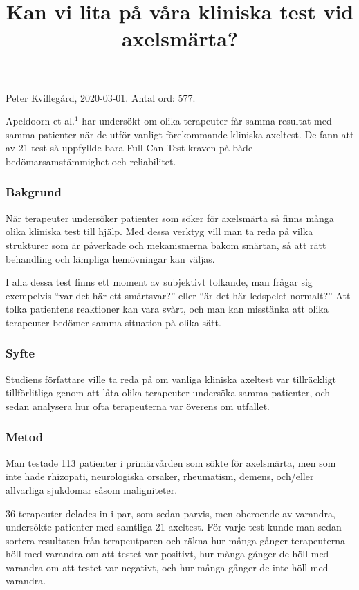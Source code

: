 \documentclass[10pt,a4paper]{article}
\title{Kan vi lita på våra kliniska test vid axelsmärta?}
\author{}
\date{}
\begin{document}
\pagestyle{empty}	

\noindent Peter Kvillegård, 2020-03-01. Antal ord: 577.
\vspace{-1em}
{\let\newpage\relax\maketitle}
\vspace{-3em}

\noindent Apeldoorn et al.$^{1}$ har undersökt om olika terapeuter får samma resultat med samma patienter när de utför vanligt förekommande kliniska axeltest. De fann att av 21 test så uppfyllde bara Full Can Test kraven på både bedömar\-sam\-stämmighet och reliabilitet.

\subsubsection*{Bakgrund}
När terapeuter undersöker patienter som söker för axelsmärta så finns många olika kliniska test till hjälp. Med dessa verktyg vill man ta reda på vilka strukturer som är påverkade och mekanismerna bakom smärtan, så att rätt behandling och lämpliga hemövningar kan väljas. 

I alla dessa test finns ett moment av subjektivt tolkande, man frågar sig exempelvis ``var det här ett smärtsvar?'' eller ``är det här ledspelet normalt?'' Att tolka patientens reaktioner kan vara svårt, och man kan misstänka att olika terapeuter bedömer samma situation på olika sätt.

\subsubsection*{Syfte}
Studiens författare ville ta reda på om vanliga kliniska axeltest var tillräckligt tillförlitliga genom att låta olika terapeuter undersöka samma patienter, och sedan analysera hur ofta terapeuterna var överens om utfallet.

\subsubsection*{Metod}
Man testade 113 patienter i primärvården som sökte för axelsmärta, men som inte hade rhizopati, neurologiska orsaker, rheumatism, demens, och/eller allvarliga sjukdomar såsom maligniteter.

36 terapeuter delades in i par, som sedan parvis, men oberoende av varandra, undersökte patienter med samtliga 21 axeltest. För varje test kunde man sedan sortera resultaten från terapeutparen och räkna hur många gånger terapeuterna höll med varandra om att testet var positivt, hur många gånger de höll med varandra om att testet var negativt, och hur många gånger de inte höll med varandra.
\end{document}
